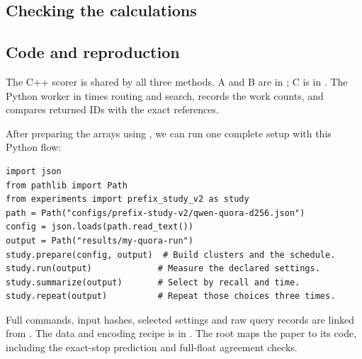 \subsection{Checking the calculations}


\subsection{Code and reproduction}
The C++ scorer is shared by all three methods. A and B are in ; C is in . The Python worker in  times routing and search, records the work counts, and compares returned IDs with the exact references.

After preparing the arrays using , we can run one complete setup with this Python flow:
\begin{lstlisting}
import json
from pathlib import Path
from experiments import prefix_study_v2 as study
path = Path("configs/prefix-study-v2/qwen-quora-d256.json")
config = json.loads(path.read_text())
output = Path("results/my-quora-run")
study.prepare(config, output)  # Build clusters and the schedule.
study.run(output)             # Measure the declared settings.
study.summarize(output)       # Select by recall and time.
study.repeat(output)          # Repeat those choices three times.
\end{lstlisting}
Full commands, input hashes, selected settings and raw query records are linked from . The data and encoding recipe is in . The root  maps the paper to its code, including the exact-stop prediction and full-float agreement checks.
